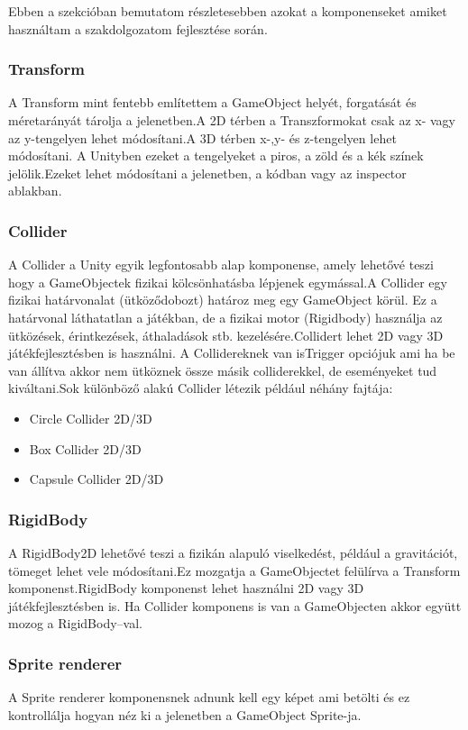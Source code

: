 \documentclass[
]{thesis-ekf}
\theoremstyle{definition}
\theoremstyle{remark}
\begin{document}
Ebben a szekcióban bemutatom részletesebben azokat a komponenseket amiket használtam a szakdolgozatom fejlesztése során.

\subsubsection{Transform}
A Transform  mint fentebb említettem a GameObject helyét, forgatását és méretarányát tárolja a jelenetben.A 2D térben a Transzformokat csak az x- vagy az y-tengelyen lehet módosítani.A 3D térben x-,y- és z-tengelyen lehet módosítani.  A Unityben ezeket a tengelyeket a piros, a zöld és a kék színek jelölik.Ezeket lehet módosítani a jelenetben, a kódban vagy az inspector ablakban.\cite{UnityTransform}
\subsubsection{Collider}
A Collider a Unity egyik legfontosabb alap komponense, amely lehetővé teszi hogy a GameObjectek fizikai kölcsönhatásba lépjenek egymással.A Collider egy fizikai határvonalat (ütköződobozt) határoz meg egy GameObject körül. Ez a határvonal láthatatlan a játékban, de a fizikai motor (Rigidbody) használja az ütközések, érintkezések, áthaladások stb. kezelésére.Collidert lehet 2D vagy 3D játékfejlesztésben is használni. A Collidereknek van isTrigger opciójuk ami ha be van állítva akkor nem ütköznek össze másik colliderekkel, de eseményeket tud kiváltani.\cite{UnityCollider}Sok különböző alakú Collider létezik például néhány fajtája:
\begin{itemize}
	\item Circle Collider 2D/3D
	\item Box Collider 2D/3D
	\item Capsule Collider 2D/3D
\end{itemize}

\subsubsection{RigidBody}
A RigidBody2D lehetővé teszi a fizikán alapuló viselkedést, például a gravitációt, tömeget lehet vele módosítani.Ez mozgatja a GameObjectet felülírva a Transform komponenst.RigidBody komponenst lehet használni 2D vagy 3D játékfejlesztésben is. Ha Collider komponens is van a GameObjecten akkor együtt mozog a RigidBody--val.\cite{UnityRigidBody}

\subsubsection{Sprite renderer}
A Sprite renderer komponensnek adnunk kell egy képet ami betölti és ez kontrollálja hogyan néz ki a jelenetben a GameObject Sprite-ja.\cite{UnitySpriteRenderer}
\end{document}

